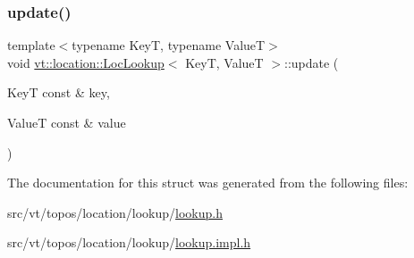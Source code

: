 \mbox{\label{structvt_1_1location_1_1_loc_lookup_a95e6e8096c0d9c5a76727ebbf441995a}} 
\subsubsection{\texorpdfstring{update()}{update()}}
{\footnotesize\ttfamily template$<$typename KeyT, typename ValueT$>$ \\
void \hyperlink{structvt_1_1location_1_1_loc_lookup}{vt\+::location\+::\+Loc\+Lookup}$<$ KeyT, ValueT $>$\+::update (\begin{DoxyParamCaption}\item[{KeyT const \&}]{key,  }\item[{ValueT const \&}]{value }\end{DoxyParamCaption})}



The documentation for this struct was generated from the following files\+:\begin{DoxyCompactItemize}
\item 
src/vt/topos/location/lookup/\hyperlink{lookup_8h}{lookup.\+h}\item 
src/vt/topos/location/lookup/\hyperlink{lookup_8impl_8h}{lookup.\+impl.\+h}\end{DoxyCompactItemize}
